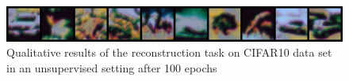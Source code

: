 \begin{figure}[h]
    \centerline{\hspace*{8mm}\includegraphics[width=1.4\textwidth]{figures/unsupervised/reconstruction_CIFAR10_RP_epoch_100.png}}
    
    \caption{Qualitative results of the reconstruction task on CIFAR10 data set in an unsupervised setting after 100 epochs}

    \label{fig:CIFAR_Images_unsupervised}
\end{figure}

\begin{figure}[h]
    \centering
    \setlength{\abovecaptionskip}{0pt plus 0pt minus 0pt}
    \setlength{\belowcaptionskip}{10pt plus 0pt minus 0pt}
\end{figure}






